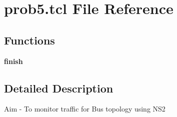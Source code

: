 \hypertarget{prob5_8tcl}{}\section{prob5.\+tcl File Reference}
\label{prob5_8tcl}
\subsection*{Functions}
\begin{DoxyCompactItemize}
\item 
\mbox{\label{prob5_8tcl_a30728837c246b65ef76298af0101d99c}} 
{\bfseries finish}
\end{DoxyCompactItemize}


\subsection{Detailed Description}
Aim -\/ To monitor traffic for Bus topology using N\+S2

\begin{DoxyVerb}
\end{DoxyVerb}
